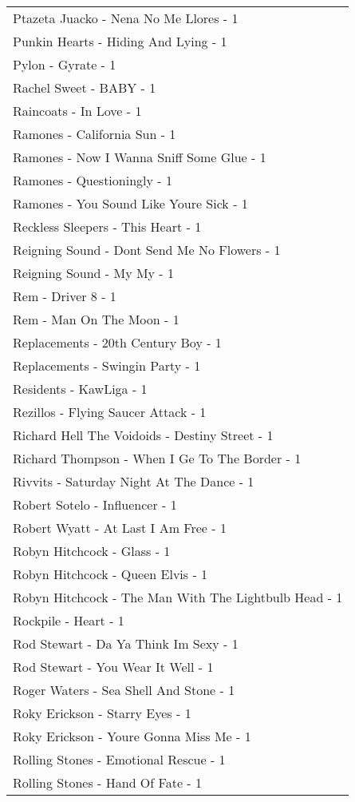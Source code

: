 \documentclass[
]{article}
\begin{document}
\begin{longtable}{l}
Ptazeta Juacko - Nena No Me Llores - 1 \\ 
Punkin Hearts - Hiding And Lying - 1 \\ 
Pylon - Gyrate - 1 \\ 
Rachel Sweet - BABY - 1 \\ 
Raincoats - In Love - 1 \\ 
Ramones - California Sun - 1 \\ 
Ramones - Now I Wanna Sniff Some Glue - 1 \\ 
Ramones - Questioningly - 1 \\ 
Ramones - You Sound Like Youre Sick - 1 \\ 
Reckless Sleepers - This Heart - 1 \\ 
Reigning Sound - Dont Send Me No Flowers - 1 \\ 
Reigning Sound - My My - 1 \\ 
Rem - Driver 8 - 1 \\ 
Rem - Man On The Moon - 1 \\ 
Replacements - 20th Century Boy - 1 \\ 
Replacements - Swingin Party - 1 \\ 
Residents - KawLiga - 1 \\ 
Rezillos - Flying Saucer Attack - 1 \\ 
Richard Hell The Voidoids - Destiny Street - 1 \\ 
Richard Thompson - When I Ge To The Border - 1 \\ 
Rivvits - Saturday Night At The Dance - 1 \\ 
Robert Sotelo - Influencer - 1 \\ 
Robert Wyatt - At Last I Am Free - 1 \\ 
Robyn Hitchcock - Glass - 1 \\ 
Robyn Hitchcock - Queen Elvis - 1 \\ 
Robyn Hitchcock - The Man With The Lightbulb Head - 1 \\ 
Rockpile - Heart - 1 \\ 
Rod Stewart - Da Ya Think Im Sexy - 1 \\ 
Rod Stewart - You Wear It Well - 1 \\ 
Roger Waters - Sea Shell And Stone - 1 \\ 
Roky Erickson - Starry Eyes - 1 \\ 
Roky Erickson - Youre Gonna Miss Me - 1 \\ 
Rolling Stones - Emotional Rescue - 1 \\ 
Rolling Stones - Hand Of Fate - 1 \\ 

\end{longtable}
\end{document}
